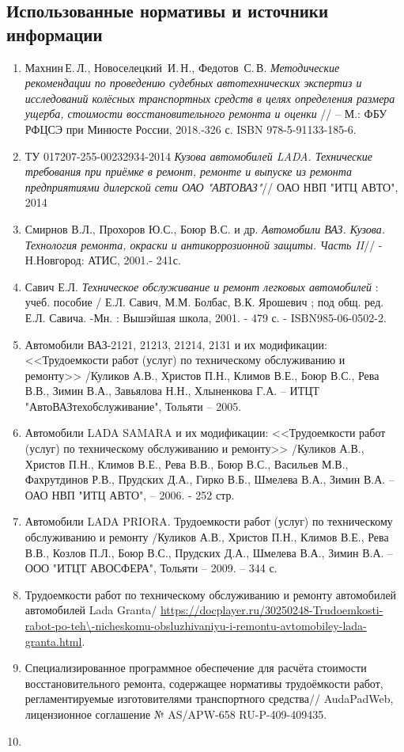 
\subsection{Использованные нормативы и источники информации}
%
\begin{enumerate}
\item 
Махнин\,Е.\,Л., Новоселецкий\, И.\,Н., Федотов\, С.\,В. \emph{Методические рекомендации по проведению судебных автотехнических экспертиз и исследований колёсных транспортных средств в целях определения размера ущерба, стоимости восстановительного ремонта и оценки} // -- М.: ФБУ РФЦСЭ при Минюсте России, 2018.-326 с.  ISBN 978-5-91133-185-6.
%
\item ТУ 017207-255-00232934-2014 \emph{Кузова автомобилей LADA. Технические требования при приёмке в ремонт, ремонте и выпуске из ремонта предприятиями дилерской сети ОАО "АВТОВАЗ"}//  ОАО НВП "ИТЦ АВТО", 2014
%
\item Смирнов  В.Л., Прохоров  Ю.С., Боюр В.С.  и др. \emph{Автомобили ВАЗ. Кузова. Технология ремонта, окраски и  антикоррозионной защиты. Часть II}// - Н.Новгород: АТИС, 2001.- 241с.
%
\item 
Савич Е.Л. \emph{Техническое  обслуживание  и  ремонт  легковых  автомобилей} : учеб. пособие / Е.Л. Савич, М.М. Болбас, В.К. Ярошевич ; под общ. ред. Е.Л. Савича. -Мн. : Вышэйшая школа,  2001. - 479 с. - ISBN985-06-0502-2.
%
\item 
Автомобили ВАЗ-2121, 21213, 21214, 2131 и их модификации: <<Трудоемкости работ (услуг) по техническому обслуживанию и ремонту>> /Куликов А.В., Христов П.Н., Климов В.Е.,  Боюр В.С., Рева В.В., Зимин В.А., Завьялова Н.Н., Хлыненкова Г.А. -- ИТЦТ "АвтоВАЗтехобслуживание", Тольяти -- 2005. 
%
\item
Автомобили LADA SAMARA и их модификации: <<Трудоемкости работ (услуг) по техническому обслуживанию и ремонту>> /Куликов А.В., Христов П.Н., Климов В.Е., Рева В.В., Боюр В.С., Васильев М.В., Фахрутдинов Р.В.,  Прудских Д.А., Гирко В.Б., Шмелева В.А., Зимин В.А. --  ОАО НВП "ИТЦ АВТО",  -- 2006. - 252 стр.
%
\item 
Автомобили LADA PRIORA. Трудоемкости работ (услуг) по техническому обслуживанию и ремонту /Куликов А.В., Христов П.Н., Климов В.Е., Рева В.В., Козлов П.Л., Боюр В.С., Прудских Д.А., Шмелева В.А., Зимин В.А. -- ООО "ИТЦТ АВОСФЕРА", Тольяти -- 2009. -- 344 с.
%
\item 
{Трудоемкости работ по техническому обслуживанию и ремонту автомобилей автомобилей Lada  Granta}/   \url{https://docplayer.ru/30250248-Trudoemkosti-rabot-po-teh\-nicheskomu-obsluzhivaniyu-i-remontu-avtomobiley-lada- granta.html}.
%
%
\item
{Специализированное программное обеспечение для расчёта стоимости  восстановительного ремонта, содержащее нормативы трудоёмкости работ, регламентируемые изготовителями транспортного средства}//   AudaPadWeb, лицензионное соглашение № AS/APW-658  RU-P-409-409435.
%
%
%
\item


\end{enumerate}
